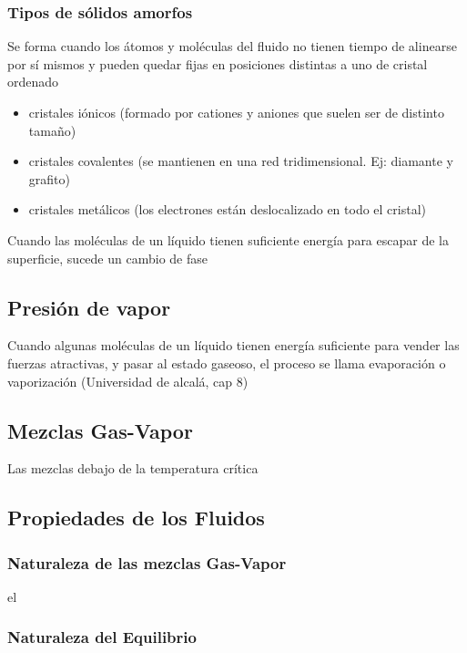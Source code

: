\subsubsection*{Tipos de sólidos amorfos}
    Se forma cuando los átomos y moléculas del fluido no tienen tiempo de alinearse por sí mismos y pueden quedar fijas en posiciones distintas a uno de cristal ordenado
    \begin{itemize}
      \item cristales iónicos (formado por cationes y aniones que suelen ser de distinto tamaño)
      \item cristales covalentes (se mantienen en una red tridimensional. Ej: diamante y grafito)
      \item cristales metálicos (los electrones están deslocalizado en todo el cristal)
    \end{itemize}


    Cuando las moléculas de un líquido tienen suficiente energía para escapar de la superficie, sucede un cambio de fase

\subsection{Presión de vapor}
    Cuando algunas moléculas de un líquido tienen energía suficiente para vender las fuerzas atractivas, y pasar al estado gaseoso, el proceso se llama evaporación o vaporización (Universidad de alcalá, cap 8)


\subsection{Mezclas Gas-Vapor}
Las mezclas debajo de la temperatura crítica


\subsection{Propiedades de los Fluidos}



  \figCoordinatePV

\subsubsection{Naturaleza de las mezclas Gas-Vapor}
el
\subsubsection{Naturaleza del Equilibrio}

